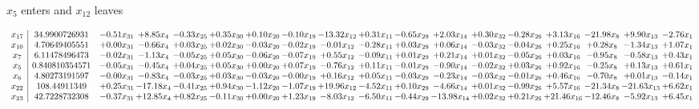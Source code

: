 \documentclass[9pt]{article}
\begin{document}
 $ x_{5} $ enters and $ x_{12} $ leaves 

 \[\begin{array}{c| c c@{\hskip 2pt} c@{\hskip 2pt} c@{\hskip 2pt} c@{\hskip 2pt} c@{\hskip 2pt} c@{\hskip 2pt} c@{\hskip 2pt} c@{\hskip 2pt} c@{\hskip 2pt} c@{\hskip 2pt} c@{\hskip 2pt} c@{\hskip 2pt} c@{\hskip 2pt} c@{\hskip 2pt} c@{\hskip 2pt} c@{\hskip 2pt} }
 x_{17}   &  34.9900726931 & -0.51 x_{31} & +  8.85 x_{4} & -0.33 x_{25} & +  0.35 x_{30} & +  0.10 x_{20} & -0.10 x_{19} & -13.32 x_{12} & +  0.31 x_{11} & -0.65 x_{29} & +  2.03 x_{14} & +  0.30 x_{32} & -0.28 x_{26} & +  3.13 x_{16} & -21.98 x_{8} & +  9.90 x_{13} & -2.76 x_{1}\\
 x_{10}   &  4.70649405551 & +  0.00 x_{31} & -0.66 x_{4} & +  0.03 x_{25} & +  0.02 x_{30} & -0.03 x_{20} & -0.02 x_{19} & -0.01 x_{12} & -0.28 x_{11} & +  0.03 x_{29} & +  0.06 x_{14} & -0.03 x_{32} & -0.04 x_{26} & +  0.25 x_{16} & +  0.28 x_{8} & -1.34 x_{13} & +  1.07 x_{1}\\
 x_{7}   &  6.11478496473 & -0.02 x_{31} & -1.13 x_{4} & -0.05 x_{25} & +  0.05 x_{30} & -0.06 x_{20} & -0.07 x_{19} & +  0.55 x_{12} & -0.09 x_{11} & +  0.01 x_{29} & +  0.21 x_{14} & +  0.01 x_{32} & -0.05 x_{26} & +  0.03 x_{16} & -0.95 x_{8} & -0.58 x_{13} & +  0.43 x_{1}\\
 x_{5}   &  0.840810354571 & -0.05 x_{31} & -0.45 x_{4} & +  0.04 x_{25} & +  0.05 x_{30} & +  0.00 x_{20} & +  0.07 x_{19} & -0.76 x_{12} & +  0.11 x_{11} & -0.01 x_{29} & -0.90 x_{14} & -0.02 x_{32} & +  0.03 x_{26} & +  0.92 x_{16} & -0.25 x_{8} & +  0.13 x_{13} & +  0.61 x_{1}\\
 x_{6}   &  4.80273191597 & -0.00 x_{31} & -0.83 x_{4} & -0.03 x_{25} & +  0.03 x_{30} & -0.03 x_{20} & -0.00 x_{19} & +  0.16 x_{12} & +  0.05 x_{11} & -0.03 x_{29} & -0.23 x_{14} & -0.03 x_{32} & -0.01 x_{26} & +  0.46 x_{16} & -0.70 x_{8} & +  0.01 x_{13} & -0.14 x_{1}\\
 x_{22}   &  108.44911349 & +  0.25 x_{31} & -17.18 x_{4} & -0.41 x_{25} & +  0.94 x_{30} & -1.12 x_{20} & -1.07 x_{19} & + 19.96 x_{12} & -4.52 x_{11} & +  0.10 x_{29} & -4.66 x_{14} & +  0.01 x_{32} & -0.99 x_{26} & +  5.57 x_{16} & -21.34 x_{8} & -21.63 x_{13} & +  6.62 x_{1}\\
 x_{23}   &  42.7228732308 & -0.37 x_{31} & + 12.85 x_{4} & +  0.82 x_{25} & -0.11 x_{30} & +  0.00 x_{20} & +  1.23 x_{19} & -8.03 x_{12} & -6.50 x_{11} & -0.44 x_{29} & -13.98 x_{14} & +  0.02 x_{32} & +  0.21 x_{26} & + 21.46 x_{16} & -12.46 x_{8} & -5.92 x_{13} & +  6.45 x_{1}\\

\end{array}\]
\end{document}
